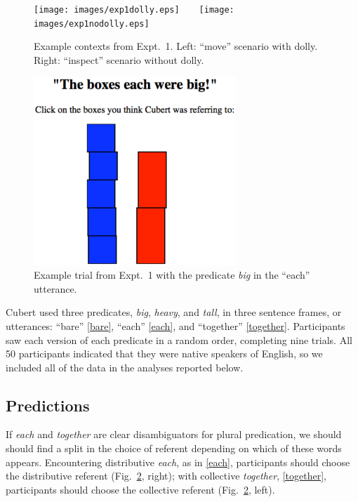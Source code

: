 \documentclass[linguex]{sp}
\begin{document}
\begin{figure}[h]
	\centering
	\texttt{[image: images/exp1dolly.eps]}\ \ \ \ 
	\texttt{[image: images/exp1nodolly.eps]}
	\caption{Example contexts from Expt.~1. Left: ``move'' scenario with dolly. Right: ``inspect'' scenario without dolly.}\label{expt1context}
\end{figure}

\begin{figure}[h]
	\centering
	\includegraphics[width=3in]{images/trial2.eps}
	\caption{Example trial from Expt.~1 with the predicate \emph{big} in the ``each'' utterance.}\label{expt1trial}
\end{figure}

 Cubert used three predicates, \emph{big}, \emph{heavy}, and \emph{tall}, in three sentence frames, or utterances: ``bare'' \ref{bare}, ``each'' \ref{each}, and ``together'' \ref{together}. Participants saw each version of each predicate in a random order, completing nine trials. All 50 participants indicated that they were native speakers of English, so we included all of the data in the analyses reported below.

\subsection{Predictions}

If \emph{each} and \emph{together} are clear disambiguators for plural predication, we should should find a split in the choice of referent depending on which of these words appears. Encountering distributive \emph{each}, as in \ref{each}, participants should choose the distributive referent (Fig.~\ref{expt1trial}, right); with collective \emph{together}, \ref{together}, participants should choose the collective referent (Fig.~\ref{expt1trial}, left). 
\end{document}
